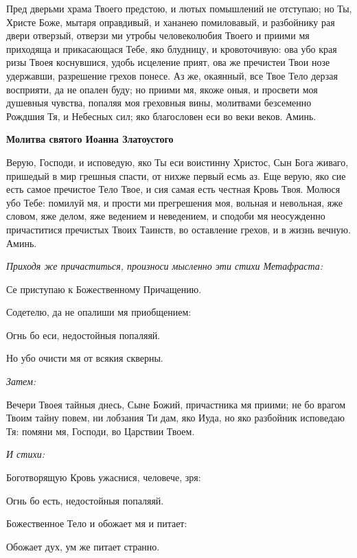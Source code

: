 Пред дверьми храма Твоего предстою, и лютых помышлений не отступаю; но Ты, Христе Боже, мытаря оправдивый, и хананею помиловавый, и разбойнику рая двери отверзый, отверзи ми утробы человеколюбия Твоего и приими мя приходяща и прикасающася Тебе, яко блудницу, и кровоточивую: ова убо края ризы Твоея коснувшися, удобь исцеление прият, ова же пречистеи Твои нозе удержавши, разрешение грехов понесе. Аз же, окаянный, все Твое Тело дерзая восприяти, да не опален буду; но приими мя, якоже оныя, и просвети моя душевныя чувства, попаляя моя греховныя вины, молитвами безсеменно Рождшия Тя, и Небесных сил; яко благословен еси во веки веков. Аминь.




\medskip
\bfseries Молитва святого Иоанна Златоустого\normalfont{}


Верую, Господи, и исповедую, яко Ты еси воистинну Христос, Сын Бога живаго, пришедый в мир грешныя спасти, от нихже первый есмь аз. Еще верую, яко сие есть самое пречистое Тело Твое, и сия самая есть честная Кровь Твоя. Молюся убо Тебе: помилуй мя, и прости ми прегрешения моя, вольная и невольная, яже словом, яже делом, яже ведением и неведением, и сподоби мя неосужденно причаститися пречистых Твоих Таинств, во оставление грехов, и в жизнь вечную. Аминь.


\medskip


\itshape Приходя же причаститься, произноси мысленно эти стихи Метафраста:\normalfont{}


  Се приступаю к Божественному Причащению.


  Содетелю, да не опалиши мя приобщением:


  Огнь бо еси, недостойныя попаляяй.


  Но убо очисти мя от всякия скверны.





\itshape Затем:\normalfont{}


  Вечери Твоея тайныя днесь, Сыне Божий, причастника мя приими; не бо врагом Твоим тайну повем, ни лобзания Ти дам, яко Иуда, но яко разбойник исповедаю Тя: помяни мя, Господи, во Царствии Твоем.


\medskip
\itshape И стихи:\normalfont{}


  Боготворящую Кровь ужаснися, человече, зря:


  Огнь бо есть, недостойныя попаляяй.


  Божественное Тело и обожает мя и питает:


  Обожает дух, ум же питает странно.


